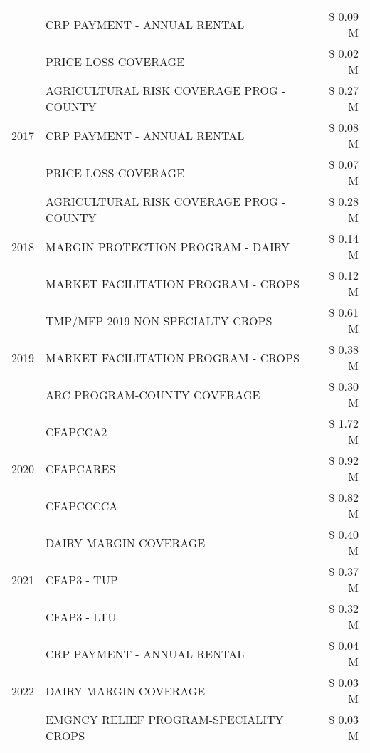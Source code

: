 \begin{tabular}{llr}
 & CRP PAYMENT - ANNUAL RENTAL & \$ 0.09 M \\
 & PRICE LOSS COVERAGE & \$ 0.02 M \\
\cline{1-3}
\multirow[t]{3}{*}{2017} & AGRICULTURAL RISK COVERAGE PROG - COUNTY & \$ 0.27 M \\
 & CRP PAYMENT - ANNUAL RENTAL & \$ 0.08 M \\
 & PRICE LOSS COVERAGE & \$ 0.07 M \\
\cline{1-3}
\multirow[t]{3}{*}{2018} & AGRICULTURAL RISK COVERAGE PROG - COUNTY & \$ 0.28 M \\
 & MARGIN PROTECTION PROGRAM - DAIRY & \$ 0.14 M \\
 & MARKET FACILITATION PROGRAM - CROPS & \$ 0.12 M \\
\cline{1-3}
\multirow[t]{3}{*}{2019} & TMP/MFP 2019 NON SPECIALTY CROPS & \$ 0.61 M \\
 & MARKET FACILITATION PROGRAM - CROPS & \$ 0.38 M \\
 & ARC PROGRAM-COUNTY COVERAGE & \$ 0.30 M \\
\cline{1-3}
\multirow[t]{3}{*}{2020} & CFAPCCA2 & \$ 1.72 M \\
 & CFAPCARES & \$ 0.92 M \\
 & CFAPCCCCA & \$ 0.82 M \\
\cline{1-3}
\multirow[t]{3}{*}{2021} & DAIRY MARGIN COVERAGE & \$ 0.40 M \\
 & CFAP3 - TUP & \$ 0.37 M \\
 & CFAP3 - LTU & \$ 0.32 M \\
\cline{1-3}
\multirow[t]{3}{*}{2022} & CRP PAYMENT - ANNUAL RENTAL & \$ 0.04 M \\
 & DAIRY MARGIN COVERAGE & \$ 0.03 M \\
 & EMGNCY RELIEF PROGRAM-SPECIALITY CROPS & \$ 0.03 M \\
\cline{1-3}
\bottomrule
\end{tabular}
